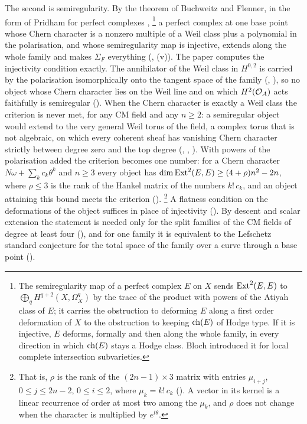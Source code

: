 The second is semiregularity. By the theorem of Buchweitz and Flenner, in the
form of Pridham for perfect complexes \cite{BF03,Pri24},%
\footnote{The semiregularity map of a perfect complex $E$ on $X$ sends
$\operatorname{Ext}^{2}(E,E)$ to $\bigoplus_{q}H^{q+2}(X,\Omega^{q}_{X})$ by the trace of
the product with powers of the Atiyah class of $E$; it carries the
obstruction to deforming $E$ along a first order deformation of $X$ to the
obstruction to keeping $\operatorname{ch}(E)$ of Hodge type. If it is injective, $E$
deforms, formally and then along the whole family, in every direction in
which $\operatorname{ch}(E)$ stays a Hodge class. Bloch introduced it for local complete
intersection subvarieties.}
a perfect complex at
one base point whose Chern character is a nonzero multiple of a Weil class
plus a polynomial in the polarisation, and whose semiregularity map is
injective, extends along the whole family and makes $\Sigma_{F}$ everything
(, (v)). The paper computes
the injectivity condition exactly. The annihilator of the Weil class in
$H^{0,2}$ is carried by the polarisation isomorphically onto the tangent space
of the family (, ), so no object
whose Chern character lies on the Weil line and on which $H^{2}(\mathcal{O}_{A})$ acts
faithfully is semiregular (). When the Chern character is
exactly a Weil class the criterion is never met, for any CM field and any
$n\ge2$: a semiregular object would extend to the very general Weil torus of
the field, a complex torus that is not algebraic, on which every coherent
sheaf has vanishing Chern character strictly between degree zero and the top
degree (, ,
). With powers of the polarisation added the criterion
becomes one number: for a Chern character $N\omega+\sum_{k}c_{k}\theta^{k}$
and $n\ge3$ every object has $\dim\operatorname{Ext}^{2}(E,E)\ge(4+\rho)n^{2}-2n$, where
$\rho\le3$ is the rank of the Hankel matrix of the numbers $k!\,c_{k}$, and
an object attaining this bound meets the criterion
().%
\footnote{That is, $\rho$ is the rank of the $(2n-1)\times3$ matrix with
entries $\mu_{i+j}$, $0\le j\le2n-2$, $0\le i\le2$, where $\mu_{k}=k!\,c_{k}$
(). A vector in its kernel is a linear recurrence of order
at most two among the $\mu_{k}$, and $\rho$ does not change when the character
is multiplied by $e^{t\theta}$.}
A flatness condition on the deformations of the object suffices in place of
injectivity (). By descent and scalar extension the
statement is needed only for the split families of the CM fields of degree at
least four (), and for one family it is equivalent to the
Lefschetz standard conjecture for the total space of the family over a curve
through a base point ().

